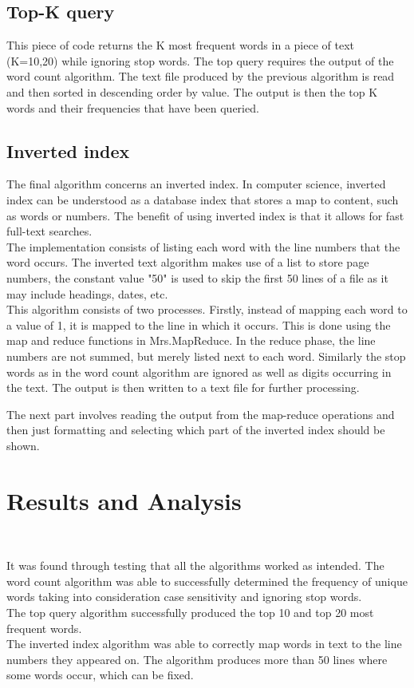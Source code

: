 \documentclass[11pt,journal]{article}
\begin{document}
\newline 

\subsection{Top-K query}
This piece of code returns the K most frequent words in a piece of text (K=10,20) while ignoring stop words. The top query requires the output of the word count algorithm. The text file produced by the previous algorithm is read and then sorted in descending order by value. The output is then the top K words and their frequencies that have been queried.  

\subsection{Inverted index}
The final algorithm concerns an inverted index. In computer science, inverted index can be understood as a database index that stores a map to content, such as words or numbers. The benefit of using inverted index is that it allows for fast full-text searches. \\
The implementation consists of listing each word with the line numbers that the word occurs. The inverted text algorithm makes use of a list to store page numbers, the constant value "50" is used to skip the first 50 lines of a file as it may include headings, dates, etc.\\
\newline
This algorithm consists of two processes. Firstly, instead of mapping each word to a value of 1, it is mapped to the line in which it occurs. This is done using the map and reduce functions in Mrs.MapReduce. In the reduce phase, the line numbers are not summed, but merely listed next to each word. Similarly the stop words as in the word count algorithm are ignored as well as digits occurring in the text. The output is then written to a text file for further processing. 

The next part involves reading the output from the map-reduce operations and then just formatting and selecting which part of the inverted index should be shown. 

\section{Results and Analysis}\

It was found through testing that all the algorithms worked as intended. The word count algorithm was able to successfully determined the frequency of unique words taking into consideration case sensitivity and ignoring stop words.\\
The top query algorithm successfully produced the top 10 and top 20 most frequent words.\\
The inverted index algorithm was able to correctly map words in text to the line numbers they appeared on. The algorithm produces more than 50 lines where some words occur, which can be fixed.  \\
\end{document}
